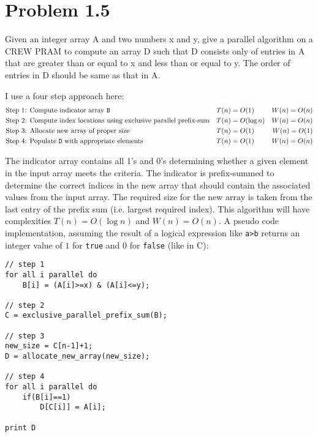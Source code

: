 \section*{Problem 1.5}
Given an integer array A and two numbers x and y, give a parallel algorithm on a CREW
PRAM to compute an array D such that D consists only of entries in A that are greater than or equal to
x and less than or equal to y. The order of entries in D should be same as that in A.
\probline

I use a four step approach here:
\begin{align*}
&\text{Step 1: Compute indicator array \texttt{B}}& &T(n) = O(1) &W(n) = O(n)\\
&\text{Step 2: Compute index locations using exclusive parallel prefix-sum}& &T(n) = O(\log n) &W(n) = O(n)\\
&\text{Step 3: Allocate new array of proper size}& &T(n) = O(1) &W(n) = O(1)\\
&\text{Step 4: Populate \texttt{D} with appropriate elements}& &T(n) = O(1) &W(n) = O(n)\\
\end{align*}

The indicator array contains all 1's and 0's determining whether a given element in the input array meets the criteria. The indicator is prefix-summed to determine the correct indices in the new array that should contain the associated values from the input array. The required size for the new array is taken from the last entry of the prefix sum (i.e. largest required index). This algorithm will have complexities $T(n) = O(\log n)$ and $W(n) = O(n)$. A pseudo code implementation, assuming the result of a logical expression like \texttt{a>b} returns an integer value of $1$ for \texttt{true} and $0$ for \texttt{false} (like in C):

\begin{lstlisting}
// step 1
for all i parallel do
	B[i] = (A[i]>=x) & (A[i]<=y);

// step 2
C = exclusive_parallel_prefix_sum(B);

// step 3
new_size = C[n-1]+1;
D = allocate_new_array(new_size);

// step 4
for all i parallel do
	if(B[i]==1)
		D[C[i]] = A[i];

print D
\end{lstlisting}